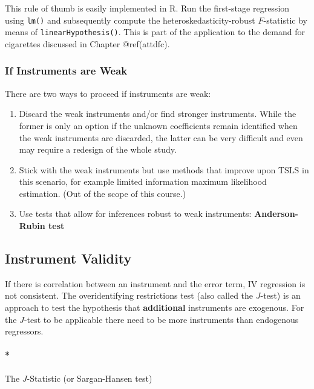 \documentclass[
  letterpaper,
  DIV=11,
  numbers=noendperiod]{scrreprt}
\let\oldparagraph\paragraph
\renewcommand{\paragraph}[1]{\oldparagraph{#1}\mbox{}}
\theoremstyle{definition}
\theoremstyle{plain}
\theoremstyle{plain}
\theoremstyle{remark}
\begin{document}
{This rule of thumb is easily implemented in \textsf{R}. Run the
first-stage regression using \texttt{lm()} and subsequently compute the
heteroskedasticity-robust \(F\)-statistic by means of
\texttt{linearHypothesis()}. This is part of the application to the
demand for cigarettes discussed in Chapter @ref(attdfc).

\hypertarget{if-instruments-are-weak}{%
\subsubsection*{If Instruments are Weak}\label{if-instruments-are-weak}}

There are two ways to proceed if instruments are weak:

\begin{enumerate}
\def\labelenumi{\arabic{enumi}.}
\item
  Discard the weak instruments and/or find stronger instruments. While
  the former is only an option if the unknown coefficients remain
  identified when the weak instruments are discarded, the latter can be
  very difficult and even may require a redesign of the whole study.
\item
  Stick with the weak instruments but use methods that improve upon TSLS
  in this scenario, for example limited information maximum likelihood
  estimation. (Out of the scope of this course.)
\item
  Use tests that allow for inferences robust to weak instruments:
  \textbf{Anderson-Rubin test}
\end{enumerate}

\hypertarget{instrument-validity}{%
\subsection{Instrument Validity}\label{instrument-validity}}

If there is correlation between an instrument and the error term, IV
regression is not consistent. The overidentifying restrictions test
(also called the \(J\)-test) is an approach to test the hypothesis that
\textbf{additional} instruments are exogenous. For the \(J\)-test to be
applicable there need to be more instruments than endogenous regressors.

\paragraph*{The $J$-Statistic (or Sargan-Hansen test)}

}
\end{document}
